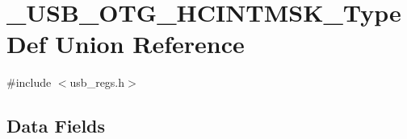 \hypertarget{union___u_s_b___o_t_g___h_c_i_n_t_m_s_k___type_def}{\section{\-\_\-\-U\-S\-B\-\_\-\-O\-T\-G\-\_\-\-H\-C\-I\-N\-T\-M\-S\-K\-\_\-\-Type\-Def Union Reference}
\label{union___u_s_b___o_t_g___h_c_i_n_t_m_s_k___type_def}
}


{\ttfamily \#include $<$usb\-\_\-regs.\-h$>$}

\subsection*{Data Fields}
